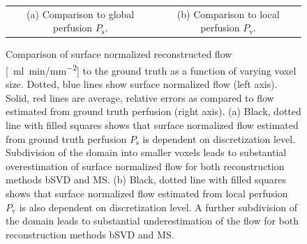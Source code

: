 \documentclass[aps,prb,article,groupedaddress,showkeys]{revtex4}
\begin{document}
\begin{figure}[!htb]
\begin{tabular}{c c}
    		(a) Comparison to global perfusion $P_{\mathrm{s}}$. & (b) Comparison to local perfusion $P_{\mathrm{v}}$.
    	\end{tabular}
    	\caption{Comparison of surface normalized reconstructed flow [\SI{}{\milli\litre\per\minute/\milli\meter\squared}] to the ground truth as a function of varying voxel size. Dotted, blue lines show surface normalized flow (left axis). Solid, red lines are average, relative errors as compared to flow estimated from ground truth perfusion (right axis). (a) Black, dotted line with filled squares shows that surface normalized flow estimated from ground truth perfusion $P_{\mathrm{s}}$ is dependent on discretization level. Subdivision of the domain into smaller voxels leads to substantial overestimation of surface normalized flow for both reconstruction methods bSVD and MS. (b) Black, dotted line with filled squares shows that surface normalized flow estimated from local perfusion $P_{\mathrm{v}}$ is also dependent on discretization level. A further subdivision of the domain leads to substantial underestimation of the flow for both reconstruction methods bSVD and MS.}
            \label{fig:surfnormperf}
    \end{figure}
\end{document}
